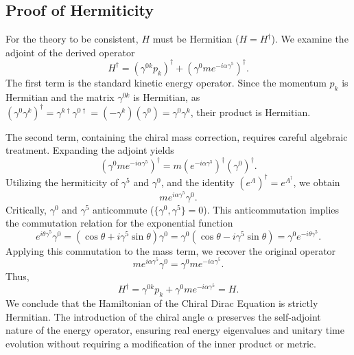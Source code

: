 \subsection{Proof of Hermiticity}

For the theory to be consistent, $H$ must be Hermitian ($H = H^\dagger$). We
examine the adjoint of the derived operator
\begin{equation}
	H^\dagger = \left( \gamma^{0k} p_k \right)^\dagger + \left( \gamma^0 m
	e^{-i \alpha \gamma^5} \right)^\dagger.
\end{equation}
The first term is the standard kinetic energy operator. Since the momentum $p_k$
is Hermitian and the matrix $\gamma^{0k}$ is Hermitian, as $(\gamma^0 \gamma^k)^\dagger
= \gamma^{k\dagger} \gamma^{0\dagger} = (-\gamma^k)(\gamma^0) = \gamma^0
\gamma^k$,
their product is Hermitian.

The second term, containing the chiral mass correction, requires careful
algebraic treatment. Expanding the adjoint yields
\begin{equation}
	\left( \gamma^0 m e^{-i \alpha \gamma^5} \right)^\dagger = m
	\left( e^{-i \alpha \gamma^5} \right)^\dagger \left( \gamma^0 \right)^\dagger.
\end{equation}
Utilizing the hermiticity of $\gamma^5$ and $\gamma^0$, and the identity
$(e^A)^\dagger = e^{A^\dagger}$, we obtain
\begin{equation}
	m e^{i \alpha \gamma^5} \gamma^0.
\end{equation}
Critically, $\gamma^0$ and $\gamma^5$ anticommute ($\{ \gamma^0, \gamma^5 \} =
0$). This anticommutation implies the commutation relation for the exponential
function
\begin{equation}
	e^{i \theta \gamma^5} \gamma^0
	= \left(\cos{\theta} + i \gamma^5 \sin{\theta}\right) \gamma^0
	= \gamma^0 \left(\cos{\theta} - i \gamma^5 \sin{\theta}\right)
	= \gamma^0 e^{-i \theta \gamma^5}.
\end{equation}
Applying this commutation to the mass term, we recover the original operator
\begin{equation}
	m e^{i \alpha \gamma^5} \gamma^0 = \gamma^0 m e^{-i \alpha \gamma^5}.
\end{equation}
Thus,
\begin{equation}
	H^\dagger = \gamma^{0k} p_k + \gamma^0 m e^{-i \alpha \gamma^5} = H.
\end{equation}
We conclude that the Hamiltonian of the Chiral Dirac Equation is strictly
Hermitian. The introduction of the chiral angle $\alpha$ preserves the
self-adjoint nature of the energy operator, ensuring real energy eigenvalues and
unitary time evolution without requiring a modification of the inner product or
metric.
